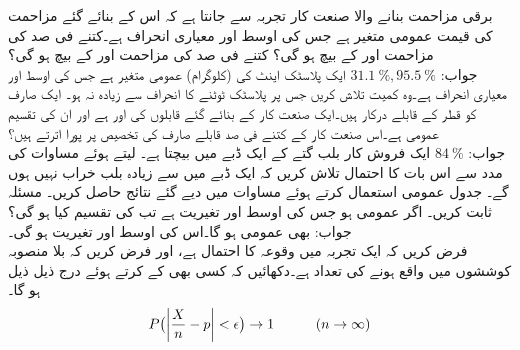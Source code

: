 \quad
برقی مزاحمت بنانے والا صنعت کار تجربہ سے جانتا ہے کہ اس کے بنائے گئے مزاحمت کی قیمت عمومی متغیر ہے جس کی اوسط  اور معیاری انحراف  ہے۔کتنے فی صد کی مزاحمت  اور  کے بیچ ہو گی؟  کتنے فی صد کی مزاحمت  اور  کے بیچ ہو گی؟  \\
جواب:\quad
$\SI{31.1}{\percent},\SI{95.5}{\percent}$
\quad
ایک پلاسٹک اینٹ کی   (کلوگرام) عمومی متغیر ہے جس کی اوسط  اور معیاری انحراف  ہے۔وہ کمیت تلاش کریں جس پر پلاسٹک ٹوٹنے کا انحراف  سے زیادہ نہ ہو۔ 
\quad
ایک صارف کو  قطر کے قابلے درکار ہیں۔ایک صنعت کار کے بنائے گئے  قابلوں کی   اور  ہے اور ان کی تقسیم عمومی ہے۔اس صنعت کار کے کتنے فی صد قابلے صارف کی تخصیص پر پورا اترتے ہیں؟\\
جواب:\quad
$\SI{84}{\percent}$
\quad
ایک فروش کار   بلب  گتے کے ایک ڈبے میں بیچتا ہے۔   لیتے ہوئے مساوات  کی مدد سے اس بات کا احتمال تلاش کریں کہ ایک ڈبے میں  سے زیادہ بلب خراب نہیں ہوں گے۔
\quad
جدول عمومی استعمال کرتے ہوئے مساوات  میں دیے گئے نتائج حاصل کریں۔
\quad
مسئلہ  ثابت کریں۔
\quad
اگر  عمومی ہو جس کی اوسط  اور تغیریت  ہے تب  کی تقسیم کیا ہو گی؟\\
جواب:\quad
{} بھی عمومی ہو گا۔اس کی اوسط  اور تغیریت  ہو گی۔
\quad {}\\
فرض کریں کہ ایک تجربہ میں وقوعہ  کا احتمال  ہے، اور فرض کریں کہ  بلا منصوبہ کوششوں میں  واقع ہونے کی تعداد  ہے۔دکھائیں کہ کسی بھی  کے  کرتے ہوئے  درج ذیل ذیل ہو گا۔
\begin{align}
P\big(\abs{\frac{X}{n}-p}<\epsilon\big)\to  1\quad \quad \quad (n\to \infty)
\end{align}
